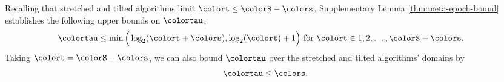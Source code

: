 Recalling that stretched and tilted algorithms limit $\colort \leq \colorS - \colors$, Supplementary Lemma \ref{thm:meta-epoch-bound} establishes the following upper bounds on $\colortau$,
\begin{align*}
\colortau
&\leq
\min\Big(
  \log_2(\colort + \colors),
  \log_2(\colort) + 1
\Big)
\text{ for } \colort \in 1, 2, \ldots, \colorS - \colors.
\end{align*}
Taking $\colort = \colorS - \colors$, we can also bound $\colortau$ over the stretched and tilted algorithms' domains by
\begin{align*}
\colortau \leq \colors.
\end{align*}


